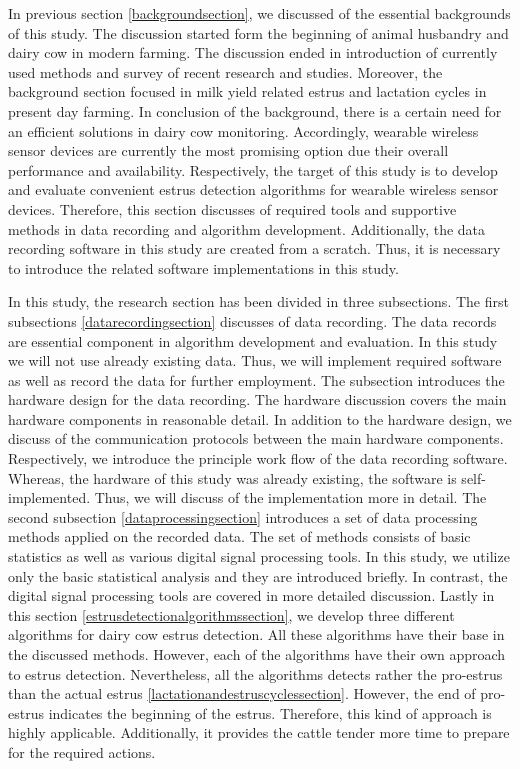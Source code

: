 \documentclass[english,12pt,a4paper,pdftex,elec,utf8]{aaltothesis}
\begin{document}
In previous section \ref{backgroundsection}, we discussed of the essential backgrounds of this study. The discussion started form the beginning of animal husbandry and dairy cow in modern farming. The discussion ended in introduction of currently used methods and survey of recent research and studies. Moreover, the background section focused in milk yield related estrus and lactation cycles in present day farming. In conclusion of the background, there is a certain need for an efficient solutions in dairy cow monitoring. Accordingly, wearable wireless sensor devices are currently the most promising option due their overall performance and availability. Respectively, the target of this study is to develop and evaluate convenient estrus detection algorithms for wearable wireless sensor devices. Therefore, this section discusses of required tools and supportive methods in data recording and algorithm development. Additionally, the data recording software in this study are created from a scratch. Thus, it is necessary to introduce the related software implementations in this study.

In this study, the research section has been divided in three subsections. The first subsections \ref{datarecordingsection}  discusses of data recording. The data records are essential component in algorithm development and evaluation. In this study we will not use already existing data. Thus, we will implement required software as well as record the data for further employment. The subsection introduces the hardware design for the data recording. The hardware discussion covers the main hardware components in reasonable detail. In addition to the hardware design, we discuss of the communication protocols between the main hardware components. Respectively, we introduce the principle work flow of the data recording software. Whereas, the hardware of this study was already existing, the software is self-implemented. Thus, we will discuss of  the implementation more in detail. The second subsection \ref{dataprocessingsection} introduces a set of data processing methods applied on the recorded data. The set of methods consists of basic statistics as well as various digital signal processing tools. In this study, we utilize only the basic statistical analysis and they are introduced briefly. In contrast, the digital signal processing tools are covered in more detailed discussion. Lastly in this section \ref{estrusdetectionalgorithmssection}, we develop three different algorithms for dairy cow estrus detection. All these algorithms have their base in the discussed methods. However, each of the algorithms have their own approach to estrus detection. Nevertheless, all the algorithms detects rather the pro-estrus than the actual estrus \ref{lactationandestruscyclessection}. However, the end of pro-estrus indicates the beginning of the estrus. Therefore, this kind of approach is highly applicable. Additionally, it provides the cattle tender more time to prepare for the required actions. 
\end{document}
